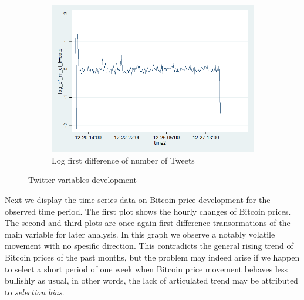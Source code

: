 \documentclass[a4paper,american,12pt]{article}
\begin{document}
\begin{spacing}{1.2}
\begin{figure}[H]
\begin{subfigure}{.3\textwidth}
	\includegraphics[width=1.12\textwidth]{stata_export_graphs/graph_plot_log_df_nr_tweets.png}
	\caption{Log first difference of number of Tweets}
	\end{subfigure}
\caption{Twitter variables development}
\end{figure}

Next we display the time series data on Bitcoin price development for the observed time period. The first plot shows the hourly changes of Bitcoin prices. The second and third plots are once again first difference transormations of the main variable for later analysis. In this graph we observe a notably volatile movement with no spesific direction. This contradicts the general rising trend of Bitcoin prices of the past months, but the problem may indeed arise if we happen to select a short period of one week when Bitcoin price movement behaves less bullishly as usual, in other words, the lack of articulated trend may be attributed to \textit{selection bias}.\\


\end{spacing}
\end{document}
